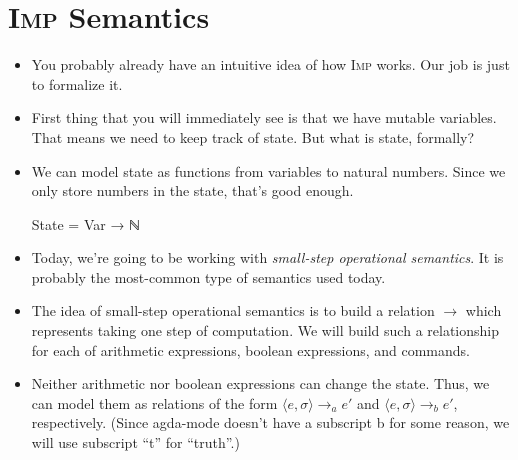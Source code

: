 \documentclass{lecturenotes}
\newcommand{\Imp}{\textsc{Imp}\xspace}
\newcommand{\astep}{\ensuremath{\mathrel{\longrightarrow_a}}}
\newcommand{\bstep}{\ensuremath{\mathrel{\longrightarrow_b}}}
\begin{document}
\section{\Imp Semantics}
\label{sec:imp-semantics}

\begin{itemize}
\item You probably already have an intuitive idea of how \Imp works.
  Our job is just to formalize it.
\item First thing that you will immediately see is that we have mutable variables.
  That means we need to keep track of state.
  But what is state, formally?
\item We can model state as functions from variables to natural numbers.
  Since we only store numbers in the state, that's good enough.
\begin{code}
State = Var → ℕ    
\end{code}
\item Today, we're going to be working with \emph{small-step operational semantics}.
  It is probably the most-common type of semantics used today.
\item The idea of small-step operational semantics is to build a relation $\longrightarrow$ which represents taking one step of computation.
  We will build such a relationship for each of arithmetic expressions, boolean expressions, and commands.
\item Neither arithmetic nor boolean expressions can change the state.
  Thus, we can model them as relations of the form $\langle e, \sigma \rangle \astep e'$  and $\langle e, \sigma \rangle \bstep e'$, respectively.
  (Since agda-mode doesn't have a subscript b for some reason, we will use subscript ``t'' for ``truth''.)
\end{itemize}

\end{document}
